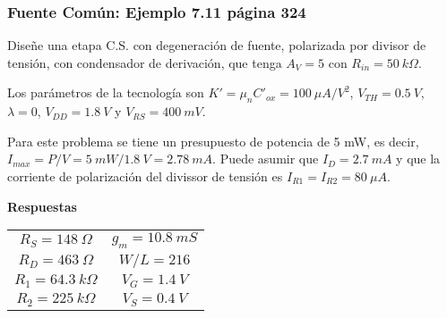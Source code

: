 \begin{frame}[t]
    \frametitle{Fuente Común: Ejemplo 7.11 página 324}

    Dise\~{n}e una etapa C.S. con degeneración de fuente, polarizada por divisor de tensión, con condensador de derivación, que tenga $A_V=5$ con $R_{in}=50\ k\Omega$.

    \vspace{3mm}
    Los parámetros de la tecnología son $K'=\mu_n C'_{ox}=100\ \mu A/V^2$, $V_{TH}=0.5\ V$, $\lambda=0$, $V_{DD}=1.8\ V$ y $V_{RS}=400\ mV$.
    
    \vspace{3mm}
    Para este problema se tiene un presupuesto de potencia de 5 mW, es decir, $I_{max}=P/V=5\ mW/1.8\ V=2.78\ mA$. Puede asumir que $I_D=2.7\ mA$ y que la corriente de polarización del divissor de tensión es $I_{R1}=I_{R2}=80\ \mu A$. 
    
    

    \vspace{10mm}
    \centering
    \textbf{Respuestas}

    \begin{table}[H]
        \begin{tabular}{cc}
            $R_S = 148\ \Omega$ & $g_m = 10.8\ mS$ \\
            $R_D = 463\ \Omega$ & $W/L=216$ \\
            $R_1 = 64.3\ k\Omega$ & $V_G = 1.4\ V$ \\
            $R_2 = 225\ k\Omega$ & $V_S = 0.4\ V$ \\
        \end{tabular}
    \end{table}
    
\end{frame}

